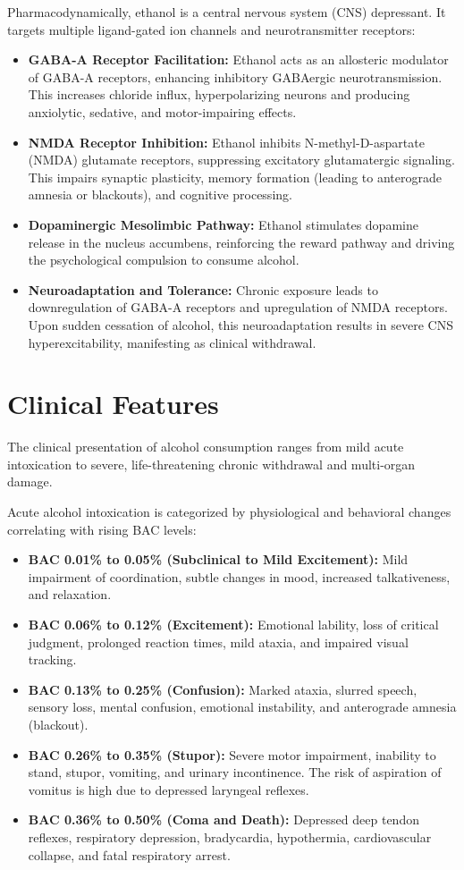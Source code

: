 Pharmacodynamically, ethanol is a central nervous system (CNS) depressant. It targets multiple ligand-gated ion channels and neurotransmitter receptors:
\begin{itemize}
    \item \textbf{GABA-A Receptor Facilitation:} Ethanol acts as an allosteric modulator of GABA-A receptors, enhancing inhibitory GABAergic neurotransmission. This increases chloride influx, hyperpolarizing neurons and producing anxiolytic, sedative, and motor-impairing effects.
    \item \textbf{NMDA Receptor Inhibition:} Ethanol inhibits N-methyl-D-aspartate (NMDA) glutamate receptors, suppressing excitatory glutamatergic signaling. This impairs synaptic plasticity, memory formation (leading to anterograde amnesia or blackouts), and cognitive processing.
    \item \textbf{Dopaminergic Mesolimbic Pathway:} Ethanol stimulates dopamine release in the nucleus accumbens, reinforcing the reward pathway and driving the psychological compulsion to consume alcohol.
    \item \textbf{Neuroadaptation and Tolerance:} Chronic exposure leads to downregulation of GABA-A receptors and upregulation of NMDA receptors. Upon sudden cessation of alcohol, this neuroadaptation results in severe CNS hyperexcitability, manifesting as clinical withdrawal.
\end{itemize}

\section*{Clinical Features}
The clinical presentation of alcohol consumption ranges from mild acute intoxication to severe, life-threatening chronic withdrawal and multi-organ damage.

Acute alcohol intoxication is categorized by physiological and behavioral changes correlating with rising BAC levels:
\begin{itemize}
    \item \textbf{BAC 0.01\% to 0.05\% (Subclinical to Mild Excitement):} Mild impairment of coordination, subtle changes in mood, increased talkativeness, and relaxation.
    \item \textbf{BAC 0.06\% to 0.12\% (Excitement):} Emotional lability, loss of critical judgment, prolonged reaction times, mild ataxia, and impaired visual tracking.
    \item \textbf{BAC 0.13\% to 0.25\% (Confusion):} Marked ataxia, slurred speech, sensory loss, mental confusion, emotional instability, and anterograde amnesia (blackout).
    \item \textbf{BAC 0.26\% to 0.35\% (Stupor):} Severe motor impairment, inability to stand, stupor, vomiting, and urinary incontinence. The risk of aspiration of vomitus is high due to depressed laryngeal reflexes.
    \item \textbf{BAC 0.36\% to 0.50\% (Coma and Death):} Depressed deep tendon reflexes, respiratory depression, bradycardia, hypothermia, cardiovascular collapse, and fatal respiratory arrest.
\end{itemize}

